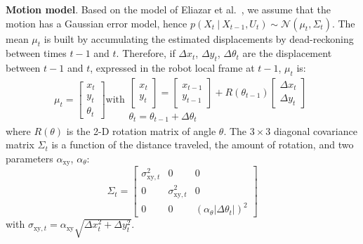 \documentclass{svmult}
\begin{document}

\textbf{Motion model}. Based on the model of Eliazar et al.~\cite{eliazar2004motionmodel}, we assume that the motion has a Gaussian error model, hence $p(X_t~|~X_{t-1}, U_{t})\sim\mathcal{N}(\mu_t,\Sigma_t)$.
The mean $\mu_t$ is built by accumulating the estimated displacements by dead-reckoning between times $t-1$ and $t$.
Therefore, if $\Delta x_t$, $\Delta y_t$, $\Delta \theta_t$ are the displacement between $t-1$ and $t$, expressed in the robot local frame at $t-1$, $\mu_t$ is:
\begin{equation}
\mu_t =
\left[ \begin{array}{c} x_t \\ y_t \\ \theta_t \end{array} \right]
\text{with}
\begin{array}{c}
\left[ \begin{array}{c} x_t \\ y_t \end{array} \right] =
\left[ \begin{array}{c} x_{t-1} \\ y_{t-1} \end{array} \right] +
R(\theta_{t-1})
\left[ \begin{array}{c} \Delta x_{t} \\ \Delta y_{t} \end{array} \right]
\\
\theta_t = \theta_{t-1} + \Delta \theta_t
\end{array}
\end{equation}
where $R(\theta)$ is the 2-D rotation matrix of angle $\theta$.
The $3\times3$ diagonal covariance matrix $\Sigma_t$ is a function of the distance traveled, the amount of rotation, and two parameters $\alpha_\mathrm{xy}$, $\alpha_\theta$:
\begin{equation}
\Sigma_t=\begin{bmatrix} \sigma_{\mathrm{xy},t}^2 & 0 & 0 \\ 0 & \sigma_{\mathrm{xy},t}^2 & 0 \\ 0 & 0 & (\alpha_\theta | \Delta \theta_t |)^2 \end{bmatrix}
\end{equation}
with $ \sigma_{\mathrm{xy},t} = \alpha_\mathrm{xy} \sqrt{\Delta x_{t}^2 + \Delta y_{t}^2}$.
\end{document}
